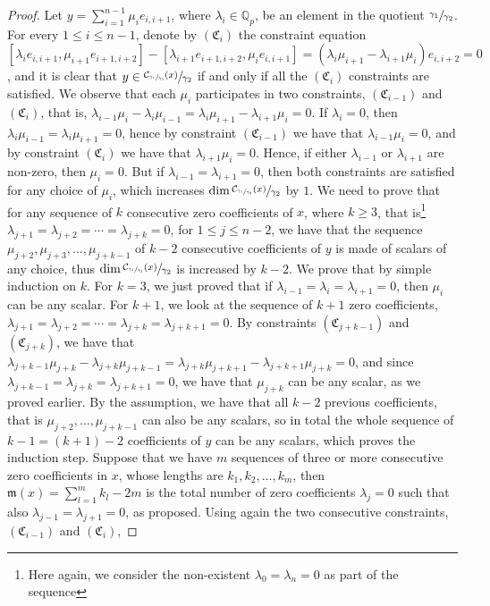 \documentclass[12pt]{article}
\begin{document}
\begin{proof}
Let $y=\sum_{i=1}^{n-1}\mu_i e_{i,i+1}$, where $\lambda_i\in\mathbb{Q}_p$, be an element in the quotient $\sfrac{\gamma_1}{\gamma_2}$.
For every $1\leq i\leq n-1$, denote by $(\mathfrak{C}_i)$ the constraint equation $[\lambda_i e_{i,i+1},\mu_{i+1}e_{i+1,i+2}]-[\lambda_{i+1}e_{i+1,i+2},\mu_i e_{i,i+1}]=(\lambda_i\mu_{i+1}-\lambda_{i+1}\mu_i)e_{i,i+2}=0$, and it is clear that $y\in\sfrac{\mathcal{C}_{\sfrac{\gamma_1}{\gamma_3}}(x)}{\gamma_2}$ if and only if all the $(\mathfrak{C}_i)$ constraints are satisfied. We observe that each $\mu_i$ participates in two constraints, $(\mathfrak{C}_{i-1})$ and $(\mathfrak{C}_i)$, that is, $\lambda_{i-1}\mu_i-\lambda_i\mu_{i-1}=\lambda_i\mu_{i+1}-\lambda_{i+1}\mu_i=0$. If $\lambda_i=0$, then $\lambda_i\mu_{i-1}=\lambda_i\mu_{i+1}=0$, hence by constraint $(\mathfrak{C}_{i-1})$ we have that $\lambda_{i-1}\mu_i=0$, and by constraint $(\mathfrak{C}_i)$ we have that $\lambda_{i+1}\mu_i=0$. Hence, if either $\lambda_{i-1}$ or $\lambda_{i+1}$ are non-zero, then $\mu_i=0$. But if $\lambda_{i-1}=\lambda_{i+1}=0$, then both constraints are satisfied for any choice of $\mu_i$, which increases $\dim\sfrac{\mathcal{C}_{\sfrac{\gamma_1}{\gamma_3}}(x)}{\gamma_2}$ by $1$. We need to prove that for any sequence of $k$ consecutive zero coefficients of $x$, where $k\geq 3$, that is\footnote{Here again, we consider the non-existent $\lambda_0=\lambda_n=0$ as part of the sequence} $\lambda_{j+1}=\lambda_{j+2}=\cdots=\lambda_{j+k}=0$, for $1\leq j\leq n-2$, we have that the sequence $\mu_{j+2},\mu_{j+3},\dots,\mu_{j+k-1}$ of $k-2$ consecutive coefficients of $y$ is made of scalars of any choice, thus $\dim\sfrac{\mathcal{C}_{\sfrac{\gamma_1}{\gamma_3}}(x)}{\gamma_2}$ is increased by $k-2$. We prove that by simple induction on $k$. For $k=3$, we just proved that if $\lambda_{i-1}=\lambda_i=\lambda_{i+1}=0$, then $\mu_i$ can be any scalar. For $k+1$, we look at the sequence of $k+1$ zero coefficients, $\lambda_{j+1}=\lambda_{j+2}=\cdots=\lambda_{j+k}=\lambda_{j+k+1}=0$. By constraints $(\mathfrak{C}_{j+k-1})$ and $(\mathfrak{C}_{j+k})$, we have that $\lambda_{j+k-1}\mu_{j+k}-\lambda_{j+k}\mu_{j+k-1}=\lambda_{j+k}\mu_{j+k+1}-\lambda_{j+k+1}\mu_{j+k}=0$, and since $\lambda_{j+k-1}=\lambda_{j+k}=\lambda_{j+k+1}=0$, we have that $\mu_{j+k}$ can be any scalar, as we proved earlier. By the assumption, we have that all $k-2$ previous coefficients, that is $\mu_{j+2},\dots,\mu_{j+k-1}$ can also be any scalars, so in total the whole sequence of $k-1=(k+1)-2$ coefficients of $y$ can be any scalars, which proves the induction step. Suppose that we have $m$ sequences of three or more consecutive zero coefficients in $x$, whose lengths are $k_1,k_2,\dots,k_m$, then $\mathfrak{m}(x)=\sum_{l=1}^m k_l-2m$ is the total number of zero coefficients $\lambda_j=0$ such that also $\lambda_{j-1}=\lambda_{j+1}=0$, as proposed. Using again the two consecutive constraints, $(\mathfrak{C}_{i-1})$ and $(\mathfrak{C}_i)$,

\end{proof}
\end{document}
